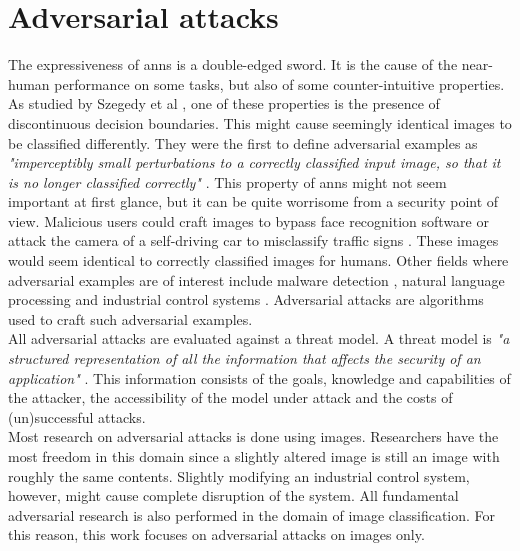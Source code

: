 \section{Adversarial attacks}\label{sec:adversarial_attacks}
The expressiveness of \glspl{ann} is a double-edged sword. It is the cause of the near-human performance on some tasks, but also of some counter-intuitive properties. As studied by Szegedy et al \cite{szegedy2014intriguing}, one of these properties is the presence of discontinuous decision boundaries. This might cause seemingly identical images to be classified differently. They were the first to define adversarial examples as \textit{"imperceptibly small perturbations to a correctly classified input image, so that it is no longer classified correctly"} \cite{szegedy2014intriguing}. This property of \glspl{ann} might not seem important at first glance, but it can be quite worrisome from a security point of view. Malicious users could craft images to bypass face recognition software \cite{face_recognition} or attack the camera of a self-driving car to misclassify traffic signs \cite{traffic_signs}. These images would seem identical to correctly classified images for humans. Other fields where adversarial examples are of interest include malware detection \cite{malware_detection}, natural language processing \cite{adversarial_nlp} and industrial control systems \cite{adversarial_industrial_control_system}. Adversarial attacks are algorithms used to craft such adversarial examples.\\ 

All adversarial attacks are evaluated against a threat model. A threat model is \textit{"a structured representation of all the information that affects the security of an application"} \cite{threat_model}. This information consists of the goals, knowledge and capabilities of the attacker, the accessibility of the model under attack and the costs of (un)successful attacks.\\

\newpage
Most research on adversarial attacks is done using images. Researchers have the most freedom in this domain since a slightly altered image is still an image with roughly the same contents. Slightly modifying an industrial control system, however, might cause complete disruption of the system. All fundamental adversarial research is also performed in the domain of image classification. For this reason, this work focuses on adversarial attacks on images only.\\ 


